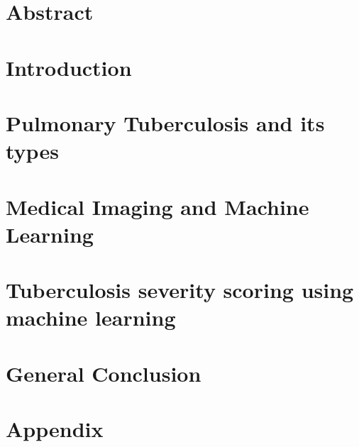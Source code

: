 \documentclass[12pt]{report}
\begin{document}
 
\chapter*{Abstract}


\tableofcontents
\chapter*{Introduction}

\chapter{Pulmonary Tuberculosis and its types}

\chapter{Medical Imaging and Machine Learning}

\chapter{Tuberculosis severity scoring using machine learning}

\chapter{General Conclusion}


\newpage
\appendix
\chapter{Appendix}

\printacronyms[include-classes=abbrev,name=Abbreviations]
\listoffigures
\listoftables
\newpage
 

\end{document}
